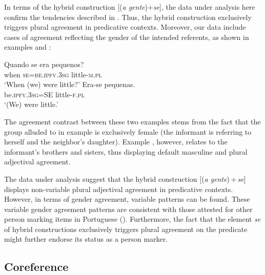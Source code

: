 \documentclass[output=paper]{langscibook}
\begin{document}
\z 

In terms of the hybrid construction [(\textit{a gente})+\textit{se}], the data under analysis here confirm the tendencies described in \citet{Martins2009}. Thus, the hybrid construction exclusively triggers plural agreement in predicative contexts. Moreover, our data include cases of agreement reflecting the gender of the intended referents, as shown in examples  and : 

\ea\label{ex:henriques:33}
 \gll Quando {se era} pequenos?\\
         when \textsc{se=be.ipfv.3sg} little-\textsc{m.pl}\\
 \glt `When (we) were little?'
\ex\label{ex:henriques:34}
 \gll Era-se pequenas.\\
         be.\textsc{ipfv.3sg}=SE little-\textsc{f.pl}\\
 \glt `(We) were little.'
\z 

The agreement contrast between these two examples stems from the fact that the group alluded to in example  is exclusively female (the informant is referring to herself and the neighbor's daughter). Example , however, relates to the informant’s brothers and sisters, thus displaying default masculine and plural adjectival agreement.


The data under analysis suggest that the hybrid construction [(\textit{a gente})\,+\,\textit{se}] displays non-variable plural adjectival agreement in predicative contexts. However, in terms of gender agreement, variable patterns can be found. These variable gender agreement patterns are consistent with those attested for other  person marking items in Portuguese (\citealt{CostaPereira2013,CostaPereira2005, Pereira2003}). Furthermore, the fact that the element \textit{se} of hybrid constructions exclusively triggers plural agreement on the predicate might further endorse its status as a  person marker.


\subsection{Coreference}\label{sec:henriques:5.4}
\end{document}
